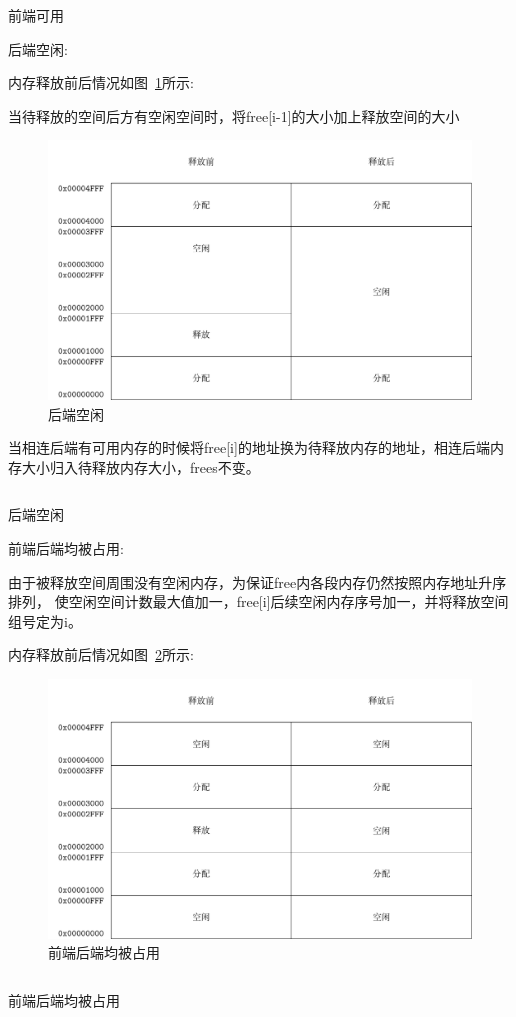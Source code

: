 \begin{listing}[H]
  \inputminted[tabsize=2, firstline=98, lastline=116,
  linenos=true]{c}{../ZOS/src/kernel/memory.c}
  \caption{前端可用}
  \label{lst:mem1}
\end{listing}


后端空闲:

内存释放前后情况如图~\ref{fig:mem2}所示:

当待释放的空间后方有空闲空间时，将free[i-1]的大小加上释放空间的大小
\begin{figure}[h]
  \centering
  \includegraphics[width=.8\textwidth]{fig/mem2.pdf}
  \caption{后端空闲}
  \label{fig:mem2}
\end{figure}

当相连后端有可用内存的时候将free[i]的地址换为待释放内存的地址，相连后端内存大小归入待释放内存大小，frees不变。

\begin{listing}[H]
  \inputminted[tabsize=2, firstline=118, lastline=127,
  linenos=true]{c}{../ZOS/src/kernel/memory.c}
  \caption{后端空闲}
  \label{lst:mem2}
\end{listing}


前端后端均被占用:

由于被释放空间周围没有空闲内存，为保证free内各段内存仍然按照内存地址升序排列，
使空闲空间计数最大值加一，free[i]后续空闲内存序号加一，并将释放空间组号定为i。

\newpage
内存释放前后情况如图~\ref{fig:mem3}所示:
\begin{figure}[h]
  \centering
  \includegraphics[width=.8\textwidth]{fig/mem3.pdf}
  \caption{前端后端均被占用}
  \label{fig:mem3}
\end{figure}

\begin{listing}[H]
  \inputminted[tabsize=2, firstline=128, lastline=141,
  linenos=true]{c}{../ZOS/src/kernel/memory.c}
  \caption{前端后端均被占用}
  \label{lst:mem3}
\end{listing}